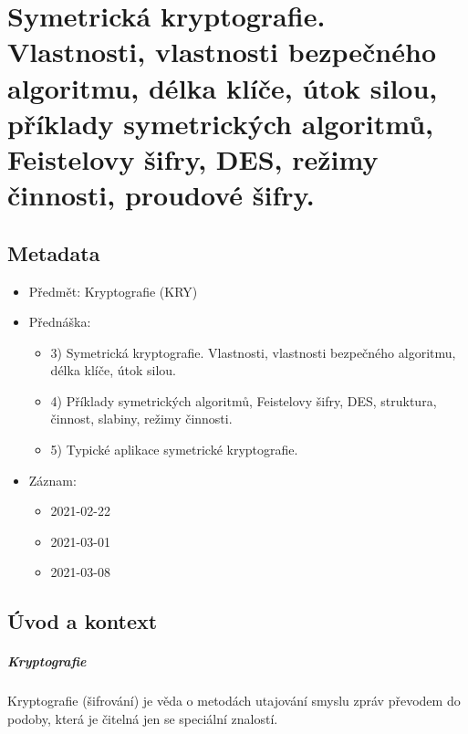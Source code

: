 

\chapter{Symetrická kryptografie. Vlastnosti, vlastnosti bezpečného algoritmu, délka klíče, útok silou,
příklady symetrických algoritmů, Feistelovy šifry, DES, režimy činnosti, proudové šifry.}


\section{Metadata}

\begin{itemize}
    \item Předmět: Kryptografie (KRY)
    \item Přednáška:
    \begin{itemize}
        \item 3) Symetrická kryptografie. Vlastnosti, vlastnosti bezpečného algoritmu, délka klíče, útok silou.
        \item 4) Příklady symetrických algoritmů, Feistelovy šifry, DES, struktura, činnost, slabiny, režimy činnosti.
        \item 5) Typické aplikace symetrické kryptografie.
    \end{itemize}
    \item Záznam:
    \begin{itemize}
        \item 2021-02-22
        \item 2021-03-01
        \item 2021-03-08
    \end{itemize}
\end{itemize}


\section{Úvod a kontext}

\paragraph*{Kryptografie} Kryptografie (šifrování) je věda o metodách utajování smyslu zpráv převodem do podoby, která je čitelná jen se speciální znalostí.

